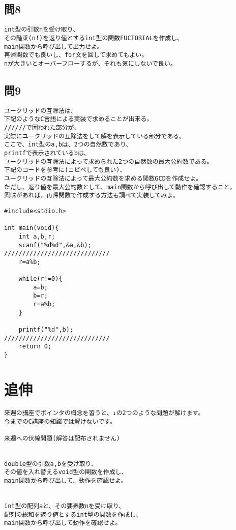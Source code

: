 \subsection{問8}
\begin{verbatim}
int型の引数nを受け取り、
その階乗(n!)を返り値とするint型の関数FUCTORIALを作成し、
main関数から呼び出して出力せよ。
再帰関数でも良いし、for文を回して求めてもよい。
nが大きいとオーバーフローするが、それも気にしないで良い。
\end{verbatim}

\subsection{問9}
\begin{verbatim}
ユークリッドの互除法は、
下記のようなC言語による実装で求めることが出来る。
//////で囲われた部分が、
実際にユークリッドの互除法をして解を表示している部分である。
ここで、int型のa,bは、2つの自然数であり、
printfで表示されているbは、
ユークリッドの互除法によって求められた2つの自然数の最大公約数である。
下記のコードを参考に(コピペしても良い)、
ユークリッドの互除法によって最大公約数を求める関数GCDを作成せよ。
ただし、返り値を最大公約数として、main関数から呼び出して動作を確認すること。
興味があれば、再帰関数で作成する方法も調べて実装してみよ。
\end{verbatim}

\begin{verbatim}
#include<stdio.h>

int main(void){
	int a,b,r;
	scanf("%d%d",&a,&b);
/////////////////////////////
	r=a%b;

	while(r!=0){
		a=b;
		b=r;
		r=a%b;
	}

	printf("%d",b);
/////////////////////////////
	return 0;
}
\end{verbatim}

\section{追伸}
\begin{verbatim}
来週の講座でポインタの概念を習うと、↓の2つのような問題が解けます。
今までのC講座の知識では解けないです。

来週への伏線問題(解答は配布されません)


double型の引数a,bを受け取り、
その値を入れ替えるvoid型の関数を作成し、
main関数から呼び出して、動作を確認せよ。


int型の配列aと、その要素数nを受け取り、
配列の総和を返り値とするint型の関数を作成し、
main関数から呼び出して動作を確認せよ。

\end{verbatim}

